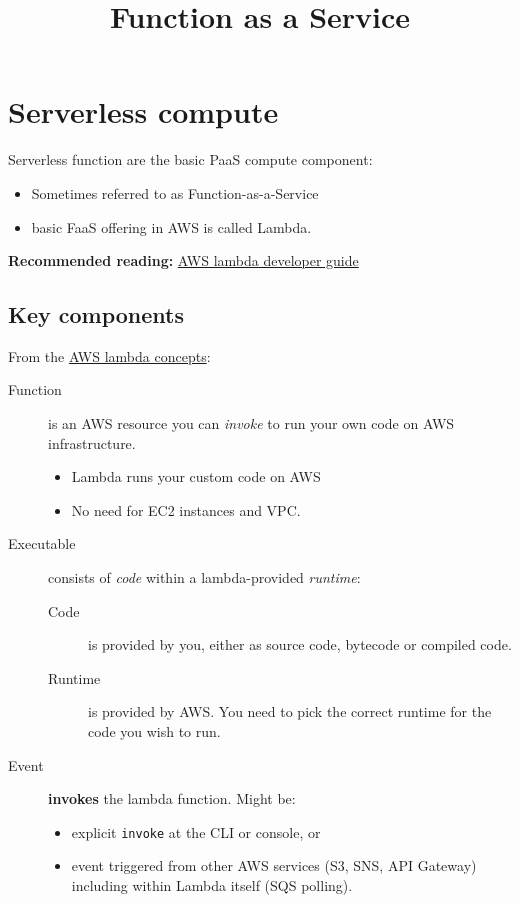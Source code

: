 \documentclass[slides]{pgnotes}
\title{Function as a Service}
\begin{document}
\maketitle

\section{Serverless compute}\label{serverless-compute}

Serverless function are the basic PaaS compute component:
\begin{itemize}
\item Sometimes referred to as Function-as-a-Service
\item basic FaaS offering in AWS is called Lambda.
\end{itemize}

\textbf{Recommended reading:}  \href{https://docs.aws.amazon.com/lambda/latest/dg/welcome.html}{AWS lambda developer guide}



\subsection{Key components}\label{key-components}

From the
\href{https://docs.aws.amazon.com/lambda/latest/dg/gettingstarted-concepts.html}{AWS
lambda concepts}:

\begin{description}
\item[Function]
is an AWS resource you can \emph{invoke} to run your own code on AWS
infrastructure.

\begin{itemize}

\item
  Lambda runs your custom code on AWS
\item
  No need for EC2 instances and VPC.
\end{itemize}
\item[Executable]
consists of \textit{code} within a lambda-provided \textit{runtime}:

\begin{description}
\item[Code]
is provided by you, either as source code, bytecode or compiled code.
\item[Runtime]
is provided by AWS. You need to pick the correct runtime for the code
you wish to run.
\end{description}

\item[Event] \textbf{invokes} the lambda function. Might be:
  \begin{itemize}
  \item explicit \texttt{invoke} at the CLI or console, or
  \item event triggered from other AWS services (S3, SNS, API Gateway) including within Lambda itself (SQS polling).
  \end{itemize}
\end{description}
\end{document}
